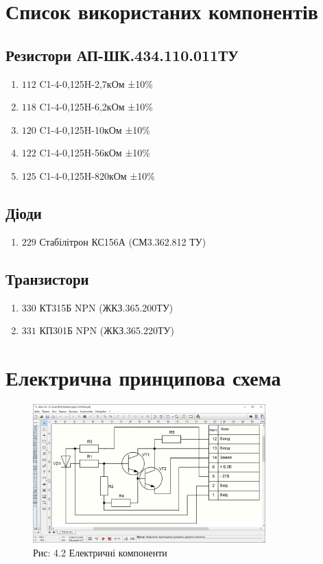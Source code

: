 \documentclass[a4paper]{article}
\begin{document}
\newpage

\section*{Список використаних компонентів}
\subsection*{Резистори АП-ШК.434.110.011ТУ}
\begin{enumerate}
    \item $112$ C1-4-0,125H-2,7кОм ±10\%
    \item $118$ C1-4-0,125H-6,2кОм ±10\%
    \item $120$ C1-4-0,125H-10кОм ±10\%
    \item $122$ C1-4-0,125H-56кОм ±10\%
    \item $125$ C1-4-0,125H-820кОм ±10\%
\end{enumerate} 

\subsection*{Діоди}
\begin{enumerate}
    \item $229$ Стабілітрон КС156А (СМ3.362.812 ТУ)
\end{enumerate}
    
\subsection*{Транзистори}
\begin{enumerate}
    \item $330$ КТ315Б NPN (ЖКЗ.365.200ТУ)
    \item $331$ КП301Б NPN (ЖКЗ.365.220ТУ)
\end{enumerate}

\section*{Електрична принципова схема}
\begin{figure}[h]
    \centering
    \includegraphics[width=0.8\textwidth]{imgs/PW4.2.png}
    \caption*{Рис: 4.2 Електричні компоненти}
\end{figure}
\end{document}
